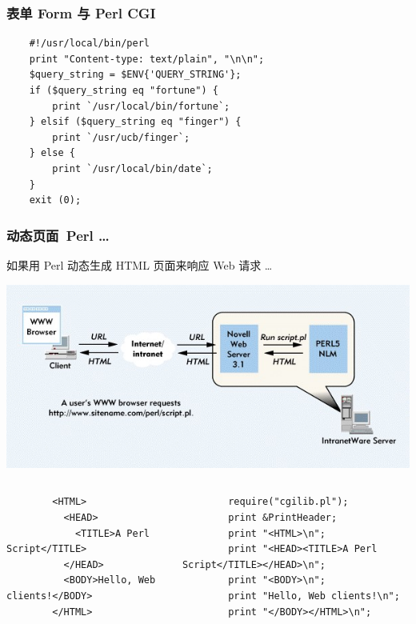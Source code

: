 \documentclass{beamer}
\begin{document}
\begin{frame}[fragile]
	\frametitle{表单 Form 与 Perl CGI}
	\begin{small}
	\begin{verbatim}
	#!/usr/local/bin/perl
	print "Content-type: text/plain", "\n\n";
	$query_string = $ENV{'QUERY_STRING'};
	if ($query_string eq "fortune") {
		print `/usr/local/bin/fortune`;
	} elsif ($query_string eq "finger") {
		print `/usr/ucb/finger`;
	} else {
		print `/usr/local/bin/date`;
	}
	exit (0);
	\end{verbatim}
	\end{small}
\end{frame}

\begin{frame}[fragile]
	\frametitle{动态页面~{\small Perl \dots}}
	如果用 Perl 动态生成 HTML 页面来响应 Web 请求 \dots \\
	\begin{center}
	\includegraphics[width=.7\textwidth]{images/nc1997_0606.jpg}
	\end{center}
	\begin{tiny}
	\begin{columns}
		\begin{verbatim}
		<HTML>
		  <HEAD>
		    <TITLE>A Perl Script</TITLE>
		  </HEAD>
		  <BODY>Hello, Web clients!</BODY>
		</HTML>
		\end{verbatim}
		\begin{verbatim}
		require("cgilib.pl"); 
		print &PrintHeader;
		print "<HTML>\n"; 
		print "<HEAD><TITLE>A Perl Script</TITLE></HEAD>\n";
		print "<BODY>\n";
		print "Hello, Web clients!\n"; 
		print "</BODY></HTML>\n";	
		\end{verbatim}
	\end{columns}
	\end{tiny}
\end{frame}
\end{document}
